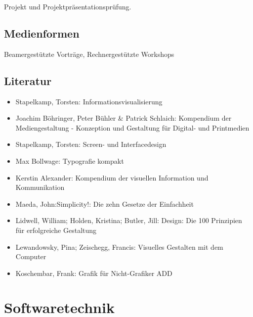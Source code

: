 Projekt und Projektpräsentationsprüfung.

\hypertarget{medienformenpathlabelmi-2017modulbeschreibungen-bachelorba_screendesign}{%
\section*{Medienformen\label{/mi-2017/modulbeschreibungen-bachelor/BA_Screendesign}}\label{medienformenpathlabelmi-2017modulbeschreibungen-bachelorba_screendesign}}

Beamergestützte Vorträge, Rechnergestützte Workshops

\hypertarget{literaturpathlabelmi-2017modulbeschreibungen-bachelorba_screendesign}{%
\section*{Literatur\label{/mi-2017/modulbeschreibungen-bachelor/BA_Screendesign}}\label{literaturpathlabelmi-2017modulbeschreibungen-bachelorba_screendesign}}

\begin{itemize}
\tightlist
\item
  Stapelkamp, Torsten: Informationsvisualisierung
\item
  Joachim Böhringer, Peter Bühler \& Patrick Schlaich: Kompendium der
  Mediengestaltung - Konzeption und Gestaltung für Digital- und
  Printmedien
\item
  Stapelkamp, Torsten: Screen- und Interfacedesign
\item
  Max Bollwage: Typografie kompakt
\item
  Kerstin Alexander: Kompendium der visuellen Information und
  Kommunikation
\item
  Maeda, John:Simplicity!: Die zehn Gesetze der Einfachheit
\item
  Lidwell, William; Holden, Kristina; Butler, Jill: Design: Die 100
  Prinzipien für erfolgreiche Gestaltung
\item
  Lewandowsky, Pina; Zeischegg, Francis: Visuelles Gestalten mit dem
  Computer
\item
  Koschembar, Frank: Grafik für Nicht-Grafiker ADD
\end{itemize}

\hypertarget{softwaretechnikpathlabelmi-2017modulbeschreibungen-bachelorba_softwaretechnik}{%
\chapter{Softwaretechnik\label{/mi-2017/modulbeschreibungen-bachelor/BA_Softwaretechnik}}\label{softwaretechnikpathlabelmi-2017modulbeschreibungen-bachelorba_softwaretechnik}}

